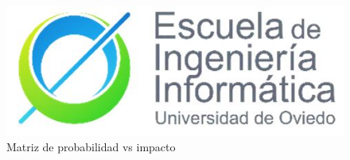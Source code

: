 \begin{figure}[H]
    \centering
    \includegraphics{figures/EscudoEscuela.jpg}
    \caption{Matriz de probabilidad vs impacto}
    \label{fig:matriz_prob_vs_impact}
\end{figure}